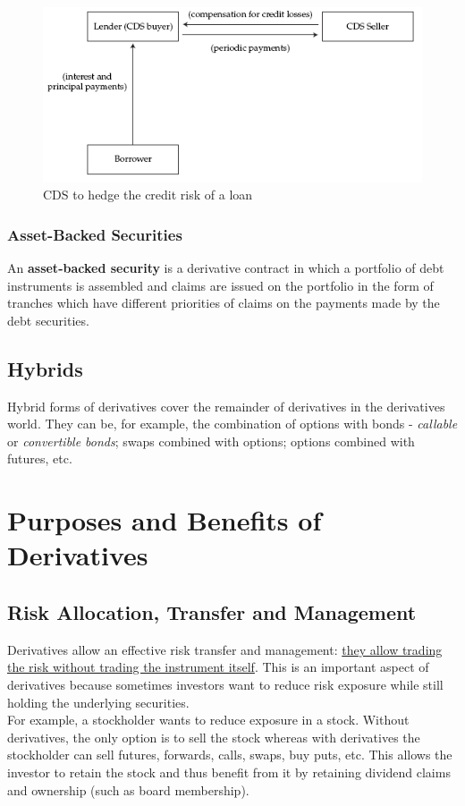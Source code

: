 \documentclass[fleqn,10pt]{SelfArx} %
\begin{document}
\begin{figure}[H]
	\centering
	\includegraphics[width=\linewidth]{3}
	\caption{CDS to hedge the credit risk of a loan}
	\label{fig:results}
\end{figure}

\subsubsection{Asset-Backed Securities}

An \textbf{asset-backed security} is a derivative contract in which a portfolio of debt instruments is assembled and claims are issued on the portfolio in the form of tranches which have different priorities of claims on the payments made by the debt securities.

\subsection{Hybrids}

Hybrid forms of derivatives cover the remainder of derivatives in the derivatives world. They can be, for example, the combination of options with bonds - \textit{callable} or \textit{convertible bonds}; swaps combined with options; options combined with futures, etc.

\newpage
\section{Purposes and Benefits of Derivatives}

\subsection{Risk Allocation, Transfer and Management}

Derivatives allow an effective risk transfer and management: \ul{they allow trading the risk without trading the instrument itself}. This is an important aspect of derivatives because sometimes investors want to reduce risk exposure while still holding the underlying securities.
\\
For example, a stockholder wants to reduce exposure in a stock. Without derivatives, the only option is to sell the stock whereas with derivatives the stockholder can sell futures, forwards, calls, swaps, buy puts, etc. This allows the investor to retain the stock and thus benefit from it by retaining dividend claims and ownership (such as board membership).
\end{document}
